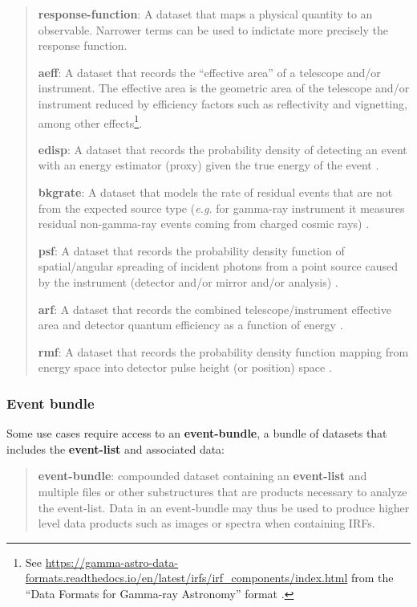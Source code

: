 \documentclass[11pt,a4paper]{ivoa}
\begin{document}
\begin{quote}
{\bf response-function}: A dataset that maps a physical quantity to an observable. Narrower terms can be used to indictate more precisely the response function.

{\bf aeff}: A dataset that records the ``effective area'' of a telescope and/or instrument.  The effective area is the geometric area of the telescope and/or instrument reduced by efficiency factors such as reflectivity and vignetting, among other effects\footnote{See \url{https://gamma-astro-data-formats.readthedocs.io/en/latest/irfs/irf_components/index.html} from the ``Data Formats for Gamma-ray Astronomy'' format \citep{deil_2022_7304668}.}.

{\bf edisp}: A dataset that records the probability density of detecting an event with an energy estimator (proxy) given the true energy of the event \citep{deil_2022_7304668}.

{\bf bkgrate}: A dataset that models the rate of residual events that are not from the expected source type ({\em e.g.\/} for gamma-ray instrument it measures residual non-gamma-ray events coming from charged cosmic rays)  \citep{deil_2022_7304668}.

{\bf psf}: A dataset that records the probability density function of spatial/angular spreading of incident photons from a point source caused by the instrument (detector and/or mirror and/or analysis) \citep{deil_2022_7304668, ogip_psf_2011}.

{\bf arf}: A dataset that records the combined telescope/instrument effective area and detector quantum efficiency as a function of energy \citep{ogip_spectrum_1998}.

{\bf rmf}: A dataset that records the probability density function mapping from energy space into detector pulse height (or position) space \citep{ogip_spectrum_1998}.
\end{quote}

\subsubsection{Event bundle}

Some use cases  require access to an {\bf event-bundle}, a bundle of datasets that includes the {\bf event-list} and associated  data:

\begin{quote}
{\bf event-bundle}: compounded dataset containing an {\bf event-list} and multiple files or other substructures that are products necessary to analyze the event-list. Data in an event-bundle may thus be used to produce higher level data products such as images or spectra when containing \glspl{IRF}.
\end{quote}
\end{document}
